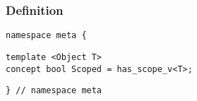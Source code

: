 
\subsubsection{Definition}

\begin{verbatim}
namespace meta {
\end{verbatim}
\begin{verbatim}
template <Object T>
concept bool Scoped = has_scope_v<T>;

\end{verbatim}
\begin{verbatim}
} // namespace meta
\end{verbatim}
